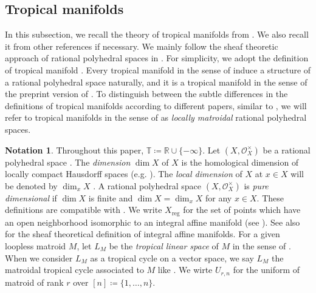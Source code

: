 \documentclass[a4paper,dvipdfmx,reqno,12pt]{amsart}
\theoremstyle{definition}
\newtheorem{notation}[theorem]{Notation}
\newcommand{\deq}{\coloneqq}
\numberwithin{equation}{section}
\begin{document}
\subsection{Tropical manifolds}
In this subsection, we recall
the theory of tropical manifolds from
\cite{shaw2011tropical,MR3330789,mikhalkin2018tropical,MR4637248,demedrano2023chern}.
We also recall it from other references if necessary.
We mainly follow the sheaf theoretic approach of
rational polyhedral spaces in \cite{MR4637248}.
For simplicity, we adopt the definition of
tropical manifold
\cite[Definition 2.3]{demedrano2023chern}.
Every tropical manifold in the sense of
\cite{demedrano2023chern} induce a structure
of a rational polyhedral space naturally,
and it is a tropical manifold in the sense of
the preprint version
\cite[Definition 6.1]{gross2019sheaftheoretic}
of \cite{MR4637248}.
To distinguish between the subtle differences
in the definitions of tropical manifolds
according to different papers,
similar to \cite[]{MR4637248},
we will refer to tropical manifolds in the sense of
\cite[Definition 6.1]{gross2019sheaftheoretic}
as \emph{locally matroidal} rational polyhedral spaces.

\begin{notation}
Throughout this paper, $\mathbb{T}\deq 
\mathbb{R}\cup\{-\infty\}$.
Let $(X,\mathcal{O}_X^{\times})$ be a rational
polyhedral space \cite[Definition 2.2]{MR4637248}.
The \emph{dimension} $\dim X$ of $X$ is 
the homological dimension of locally compact
Hausdorff spaces (e.g.
\cite[Chapter III. Definition 9.4]{MR842190}).
The \emph{local dimension} of $X$ at $x\in X$
will be denoted by $\dim_x X$
\cite[Chapter III. Definition 9.10]{MR842190}.
A rational polyhedral space $(X,\mathcal{O}_X^{\times})$
is \emph{pure dimensional} if $\dim X$ is finite and
$\dim X=\dim_x X$ for any $x\in X$.
These definitions are compatible with
\cite[Definition 7.1.1]{mikhalkin2018tropical}.
We write $X_{\mathrm{reg}}$ for the set of points
which have an open neighborhood isomorphic to an
integral affine manifold
\cite[Definition 2.7]{MR4637248}
(see \cite{MR3894860}).
See also \cite[Definition 3]{MR2181810}
for the sheaf theoretical
definition of integral affine manifolds.
For a given loopless matroid $M$, let
$L_M$ be the \emph{tropical linear space} of
$M$ in the sense of \cite[]{MR4637248}.
When we consider $L_M$ as a tropical cycle on a vector
space, we say $L_M$ the matroidal tropical cycle associated
to $M$ like \cite{demedrano2023chern}.
We wirte $U_{r,n}$ for the uniform of matroid of rank $r$ 
over $[n]\deq \{1,\ldots,n\}$.
\end{notation}
\end{document}
